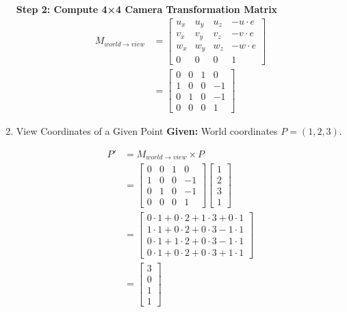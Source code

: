 \documentclass{article}
\begin{document}
\begin{enumerate}
        \textbf{Step 2: Compute 4×4 Camera Transformation Matrix}
        \begin{align*}
            M_{world \to view} &= 
            \begin{bmatrix}
            u_x & u_y & u_z & -u \cdot e \\
            v_x & v_y & v_z & -v \cdot e \\
            w_x & w_y & w_z & -w \cdot e \\
            0 & 0 & 0 & 1
            \end{bmatrix} \\
            &= 
            \begin{bmatrix}
            0 & 0 & 1 & 0 \\
            1 & 0 & 0 & -1 \\
            0 & 1 & 0 & -1 \\
            0 & 0 & 0 & 1
            \end{bmatrix}
        \end{align*}
    \item View Coordinates of a Given Point
        \medbreak
        \textbf{Given:} World coordinates $P = (1,2,3)$.

        \begin{align*}
        P' &= M_{world \to view} \times P \\
        &= 
        \begin{bmatrix}
        0 & 0 & 1 & 0 \\
        1 & 0 & 0 & -1 \\
        0 & 1 & 0 & -1 \\
        0 & 0 & 0 & 1
        \end{bmatrix}
        \begin{bmatrix}
        1 \\
        2 \\
        3 \\
        1
        \end{bmatrix} \\
        &= 
        \begin{bmatrix}
        0 \cdot 1 + 0 \cdot 2 + 1 \cdot 3 + 0 \cdot 1 \\
        1 \cdot 1 + 0 \cdot 2 + 0 \cdot 3 - 1 \cdot 1 \\
        0 \cdot 1 + 1 \cdot 2 + 0 \cdot 3 - 1 \cdot 1 \\
        0 \cdot 1 + 0 \cdot 2 + 0 \cdot 3 + 1 \cdot 1
        \end{bmatrix} \\
        &= 
        \begin{bmatrix}
        3 \\
        0 \\
        1 \\
        1
        \end{bmatrix}
        \end{align*}
        

\end{enumerate}
\end{document}
